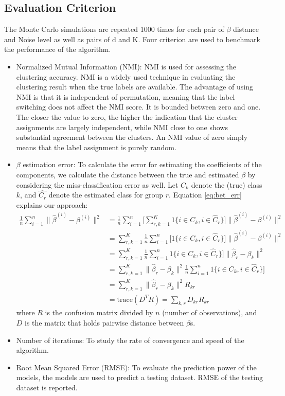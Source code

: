 \documentclass[12pt]{article}
\begin{document}
\subsection{Evaluation Criterion}
The Monte Carlo simulations are repeated 1000 times for each pair of $\beta$ distance and Noise level as well as pairs of d and K. Four criterion are used to benchmark the performance of the algorithm.
\begin{itemize}
\item Normalized Mutual Information (NMI): NMI is used for assessing the clustering accuracy. NMI is a widely used technique in evaluating the clustering result when the true labels are available. The advantage of using NMI is that it is independent of permutation, meaning that the label switching does not affect the NMI score. It is bounded between zero and one. The closer the value to zero, the higher the indication that the cluster assignments are largely independent, while NMI close to one shows substantial agreement between the clusters. An NMI value of zero simply means that the label assignment is purely random.
\item $\beta$ estimation error: To calculate the error for estimating the coefficients of the components, we calculate the distance between the true and estimated $\beta$ by considering the miss-classification error as well. Let $C_k$ denote the (true) class $k$, and $\hat{C_r}$ denote the estimated class for group $r$. Equation \eqref{eq:bet_err} explains our approach:
\begin{align}\label{eq:bet_err}
\frac1n \sum_{i=1}^n \| \hat\beta^{(i)} - \beta^{(i)} \|^2 
		&=\frac1n \sum_{i=1}^n\Big[
		\sum_{r,k=1}^K  1\{ i \in C_k,  i \in \hat  C_r\}\Big] 
		\| \hat\beta^{(i)} - \beta^{(i)} \|^2\\
		&= \sum_{r,k=1}^K 	\frac1n \sum_{i=1}^n \Big[1\{ i \in C_k,  i \in \hat  C_r\}\Big]
	\| \hat\beta^{(i)} - \beta^{(i)} \|^2 \\
		&= \sum_{r,k=1}^K 	\frac1n \sum_{i=1}^n 1\{ i \in C_k,  i \in \hat  C_r\}\Big] 
		\| \hat\beta_r - \beta_k \|^2 \\
	   &=	 \sum_{r,k=1}^K 	\| \hat\beta_r - \beta_k \|^2	\frac1n \sum_{i=1}^n 1\{ i \in C_k,  i \in \hat  C_r\}\Big] 
	   \\ &= \sum_{r,k=1}^K 	\| \hat\beta_r - \beta_k \|^2 R_{kr} \\
	   &= \text{trace}(D^T R) = \sum_{k,r} D_{kr} R_{kr}	  
\end{align}
\noindent 
where $R$ is the confusion matrix divided by $n$ (number of observations), and $D$ is the matrix that holds pairwise distance between $\beta$s. 
\item Number of iterations: To study the rate of convergence and speed of the algorithm.
\item Root Mean Squared Error (RMSE): To evaluate the prediction power of the models, the models are used to predict a testing dataset. RMSE of the testing dataset is reported. 
\end{itemize}
 
\end{document}
